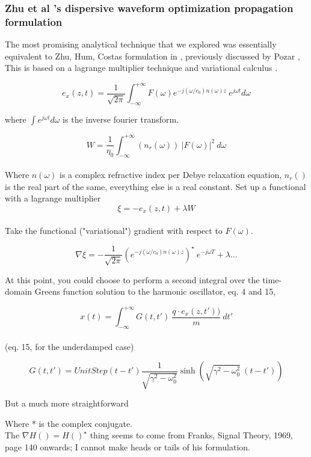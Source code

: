 \documentclass[paper.tex]{subfiles}
\begin{document}
\subsubsection{Zhu et al 's dispersive waveform optimization propagation formulation}

The most promising analytical technique that we explored was essentially equivalent to Zhu, Hum, 
Costas formulation in \cite{Microwave2012b}, previously discussed by Pozar \cite{Waveform2003}, 
This is based on a lagrange multiplier technique\cite{Methods1989} and variational 
calculus\footnotetext{} .

$$ e_x(z,t) = \frac{1}{\sqrt{2 \pi}} \int_{-\infty}^{+\infty}{F(\omega) e^{- j (\omega/c_0)n(\omega)z}\ e^{j\omega t} d\omega} $$

where $\int e^{j \omega t} d\omega$ is the inverse fourier transform.

$$W = \frac{1}{\eta_0} \int_{-\infty}^{+\infty}{(n_r(\omega))\ |F(\omega)|^2}\ d\omega$$\\

Where $n(\omega)$ is a complex refractive index per Debye relaxation equation, $n_r()$ is the real part of the same, everything else is a real constant. Set up a functional with a lagrange multiplier\\

$$\xi = -e_x(z,t) + \lambda W$$\\

Take the functional ("variational") gradient with respect to $F(\omega)$.

$$ \nabla \xi = -\frac{1}{\sqrt{2\pi}} \left(e^{- j (\omega/c_0)n(\omega)z}\right)^\star \  e^{-j\omega T} + \lambda...$$

At this point, you could choose to perform a second integral over the time-domain Greens function solution to the harmonic oscillator\cite{Complex2020}, eq. 4 and 15, 

$$x(t) = \int_{-\infty}^{+\infty}{G(t,t')\ \frac{q\cdot e_x(z,t'))}{m}\ } dt'$$\\

(eq. 15, for the underdamped case)

$$G(t,t') = UnitStep(t-t') \frac{1}{\sqrt{\gamma^2-\omega_0^2}  }\sinh\left({\sqrt{\gamma^2-\omega_0^2}}\ (t-t')\right)$$

But a much more straightforward 

Where * is the complex conjugate.\\

The $\nabla H() = H()^\star$ thing seems to come from Franks, Signal Theory, 1969, page 140 onwards; I cannot make heads or tails of his formulation.
\end{document}
